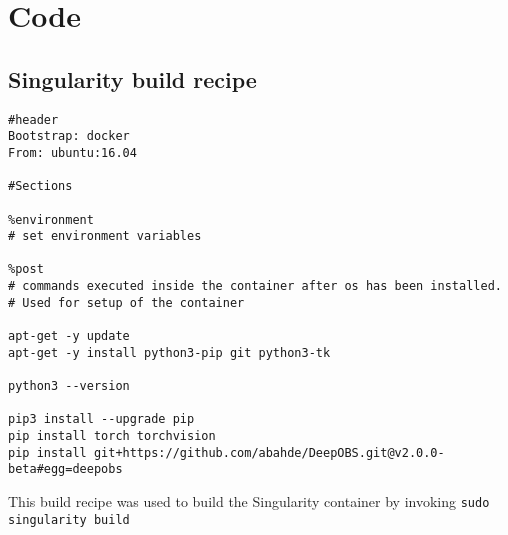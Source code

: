 \documentclass[twoside,12pt,a4paper]{report}
\begin{document}
\appendix %
\chapter{Code}
\section{Singularity build recipe}
\begin{verbatim}
#header
Bootstrap: docker
From: ubuntu:16.04

#Sections

%environment
# set environment variables

%post
# commands executed inside the container after os has been installed.
# Used for setup of the container

apt-get -y update
apt-get -y install python3-pip git python3-tk

python3 --version

pip3 install --upgrade pip
pip install torch torchvision
pip install git+https://github.com/abahde/DeepOBS.git@v2.0.0-beta#egg=deepobs

\end{verbatim}
This build recipe was used to build the Singularity container by invoking \verb|sudo singularity build|
\end{document}
